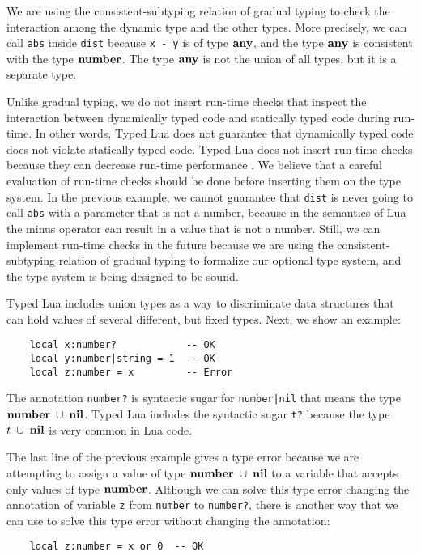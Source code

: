 We are using the consistent-subtyping relation of gradual
typing to check the interaction among the dynamic type and the other
types.
More precisely, we can call \texttt{abs} inside \texttt{dist} because
\texttt{x - y} is of type $\mathbf{any}$, and the type $\mathbf{any}$ is
consistent with the type $\mathbf{number}$.
The type $\mathbf{any}$ is not the union of all types, but it is a separate
type.

Unlike gradual typing, we do not insert run-time checks that
inspect the interaction between dynamically typed code and statically
typed code during run-time.
In other words, Typed Lua does not guarantee that dynamically typed
code does not violate statically typed code.
Typed Lua does not insert run-time checks because they can decrease
run-time performance \citep{allende2013cis}.
We believe that a careful evaluation of run-time checks should be done
before inserting them on the type system.
In the previous example, we cannot guarantee that \texttt{dist} is never
going to call \texttt{abs} with a parameter that is not a number,
because in the semantics of Lua the minus operator can result in a
value that is not a number.
Still, we can implement run-time checks in the future because we are
using the consistent-subtyping relation of gradual typing to
formalize our optional type system, and the type system is being
designed to be sound.

Typed Lua includes union types as a way to discriminate data
structures that can hold values of several different, but fixed types.
Next, we show an example:
\begin{verbatim}
    local x:number?            -- OK
    local y:number|string = 1  -- OK
    local z:number = x         -- Error
\end{verbatim}

The annotation \texttt{number?} is syntactic sugar for
\texttt{number|nil} that means the type $\mathbf{number}\;\cup\;\mathbf{nil}$.
Typed Lua includes the syntactic sugar \texttt{t?} because the
type $t\;\cup\;\mathbf{nil}$ is very common in Lua code.

The last line of the previous example gives a type error because we
are attempting to assign a value of type $\mathbf{number}\;\cup\;\mathbf{nil}$
to a variable that accepts only values of type $\mathbf{number}$.
Although we can solve this type error changing the annotation of
variable \texttt{z} from \texttt{number} to \texttt{number?}, there is
another way that we can use to solve this type error without changing
the annotation:
\begin{verbatim}
    local z:number = x or 0  -- OK
\end{verbatim}

